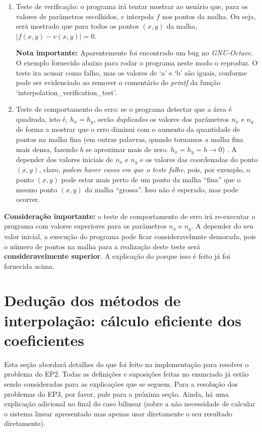 \documentclass[11pt]{article}
\begin{document}
\begin{enumerate}
  \item Teste de verificação: o programa irá tentar mostrar ao usuário que, para os valores de parâmetros escolhidos, $v$ interpola $f$ nos pontos da malha. Ou seja, será mostrado
  que para todos os pontos $(x, y)$ da malha, $|f(x, y) - v(x, y)| = 0$.

  \textbf{Nota importante:} Aparentemente foi encontrado um bug no \textit{GNU-Octave}. O exemplo fornecido abaixo para rodar
  o programa neste modo o reproduz. O teste ira acusar como falho, mas os valores de `a' e `b' são iguais, conforme pode ser evidenciado ao remover o comentário do \textit{printf} da função `interpolation\_verification\_test'.
  \item Teste de comportamento do erro: se o programa detectar que a área é quadrada, isto é, $h_x = h_y$, serão \textit{duplicados} os valores dos parâmetros $n_x$ e $n_y$ de forma a mostrar
  que o erro diminui com o aumento da quantidade de pontos na malha fina (em outras palavras, quando tornamos a malha fina mais densa, fazendo \textit{h} se aproximar mais de zero. $h_x = h_y = h \rightarrow 0$) .
  A depender dos valores iniciais de $n_x$ e $n_y$ e os valores das coordenadas do ponto $(x, y)$, claro, \textit{podem haver casos em que o teste falhe}, pois, por exemplo, o ponto $(x, y)$
  pode estar mais perto de um ponto da malha ``fina'' que o mesmo ponto $(x, y)$ da malha ``grossa''. Isso não é esperado, mas pode ocorrer.
\end{enumerate}

\textbf{Consideração importante:} o teste de comportamento de erro irá re-executar o programa com valores superiores para os parâmetros $n_x$ e $n_y$. A depender do seu valor inicial,
a execução do programa pode ficar consideravelmnte demorada, pois o número de pontos na malha para a realização deste teste será \textbf{consideravelmente superior}. A explicação do porque isso é feito
já foi fornecida acima.

\pagebreak

\section{Dedução dos métodos de interpolação: cálculo eficiente dos coeficientes}

\indent\indent Esta seção abordará detalhes do que foi feito na
implementação para resolver o problema do EP2. Todas as definições e suposições
feitas no enunciado já estão sendo consideradas para as explicações que se
seguem. Para a resolução dos problemas do EP3, por favor, pule para a próxima seção. Ainda, há
uma explicação adicional no final do caso bilinear (sobre a não necessidade de calcular o sistema linear
apresentado mas apenas usar diretamente o seu resultado diretamente).
\end{document}
